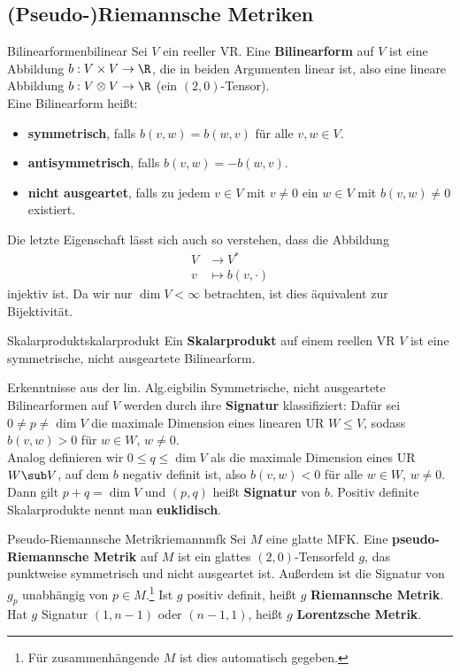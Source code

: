 \subsection{(Pseudo-)Riemannsche Metriken}
\label{subsec:metric}
\begin{definition}{Bilinearformen}{bilinear}
Sei $V$ ein reeller VR. Eine \textbf{Bilinearform} auf $V$ ist eine Abbildung $b: V \times V \to \R$, die in beiden Argumenten linear ist, also eine lineare Abbildung $b: V \otimes V \to \R$ (ein $(2,0)$-Tensor).\\
Eine Bilinearform heißt:
\begin{itemize}
\item \textbf{symmetrisch}, falls $b(v,w)=b(w,v)$ für alle $v,w \in V$.
\item \textbf{antisymmetrisch}, falls $b(v,w)=-b(w,v)$.
\item \textbf{nicht ausgeartet}, falls zu jedem $v \in V$ mit $v \neq 0$ ein $w \in V$ mit $b(v,w) \neq 0$ existiert.
\end{itemize}
Die letzte Eigenschaft lässt sich auch so verstehen, dass die Abbildung 
\begin{align}
V &\to V^\ast\\
v &\mapsto b(v, \cdot)
\end{align}
injektiv ist. Da wir nur $\dim V < \infty$ betrachten, ist dies äquivalent zur Bijektivität.
\end{definition}
\begin{definition}{Skalarprodukt}{skalarprodukt}
Ein \textbf{Skalarprodukt} auf einem reellen VR $V$ ist eine symmetrische, nicht ausgeartete Bilinearform.
\end{definition}
\begin{satz}{Erkenntnisse aus der lin. Alg.}{eigbilin}
Symmetrische, nicht ausgeartete Bilinearformen auf $V$ werden durch ihre \textbf{Signatur} klassifiziert: Dafür sei $0 \neq p \neq \dim V$ die maximale Dimension eines linearen UR $W \leq V$, sodass $b(v,w) > 0$ für $w \in W$, $w \neq 0$.\\
Analog definieren wir $0 \leq q \leq \dim V$ als die maximale Dimension eines UR $W \sub V$, auf dem $b$ negativ definit ist, also $b(v,w) < 0$ für alle $w \in W$, $w \neq 0$.\\
Dann gilt $p+q = \dim V$ und $(p,q)$ heißt \textbf{Signatur} von $b$. Positiv definite Skalarprodukte nennt man \textbf{euklidisch}.
\end{satz}
\begin{definition}{Pseudo-Riemannsche Metrik}{riemannmfk}
Sei $M$ eine glatte MFK. Eine \textbf{pseudo-Riemannsche Metrik} auf $M$ ist ein glattes $(2,0)$-Tensorfeld $g$, das punktweise symmetrisch und nicht ausgeartet ist. Außerdem ist die Signatur von $g_p$ unabhängig von $p \in M$.\footnote{Für zusammenhängende $M$ ist dies automatisch gegeben.} Ist $g$ positiv definit, heißt $g$ \textbf{Riemannsche Metrik}. Hat $g$ Signatur $(1,n-1)$ oder $(n-1,1)$, heißt $g$ \textbf{Lorentzsche Metrik}.
\end{definition}
